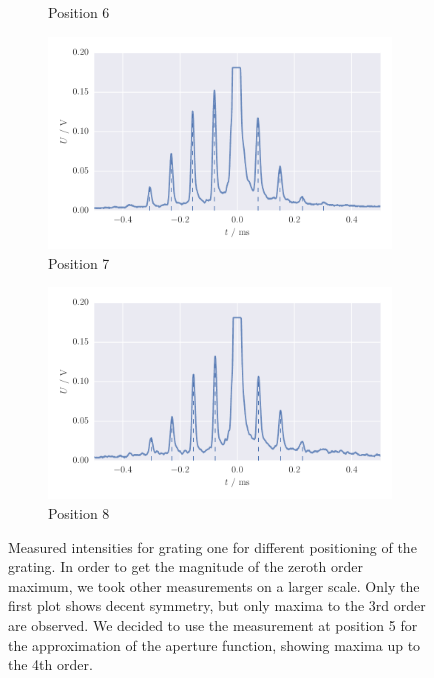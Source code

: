 \begin{figure}[H]
\begin{subfigure}[b]{\mpltw}
        \caption{Position 6}
        \label{}
    \end{subfigure}
    \begin{subfigure}[b]{\mpltw}
        \includegraphics[width=\textwidth]{figures/aperture_7b}
        \caption{Position 7}
        \label{}
    \end{subfigure}
    \begin{subfigure}[b]{\mpltw}
        \includegraphics[width=\textwidth]{figures/aperture_8b}
        \caption{Position 8}
        \label{}
    \end{subfigure}
    \caption{
        Measured intensities for grating one for different positioning of the grating.
        In order to get the magnitude of the zeroth order maximum, we took other measurements 
        on a larger scale. Only the first plot shows decent symmetry, but only 
        maxima to the 3rd order are observed. We decided to use the measurement 
        at position 5 for the approximation of the aperture function, showing maxima 
        up to the 4th order. 
        }
    \label{fig:aperture_positions_detail}
\end{figure}

